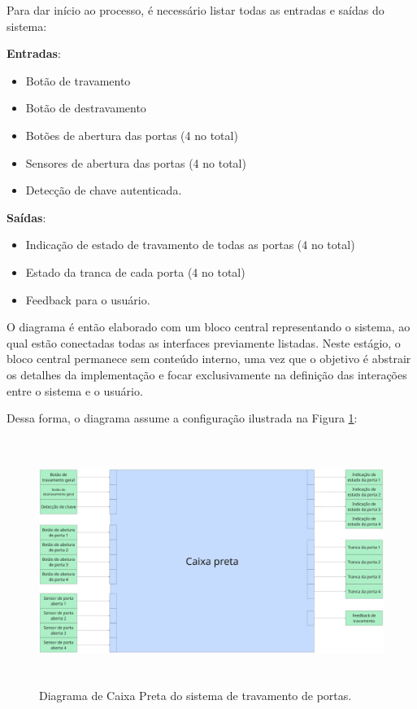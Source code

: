 Para dar início ao processo, é necessário listar todas as entradas e saídas do sistema:

\textbf{Entradas}:

\begin{itemize}
    \item Botão de travamento
    \item Botão de destravamento
    \item Botões de abertura das portas (4 no total)
    \item Sensores de abertura das portas (4 no total)
    \item Detecção de chave autenticada.
\end{itemize}

\textbf{Saídas}:

\begin{itemize}
    \item Indicação de estado de travamento de todas as portas (4 no total)
    \item Estado da tranca de cada porta (4 no total)
    \item Feedback para o usuário.
\end{itemize}

O diagrama é então elaborado com um bloco central representando o sistema, ao qual estão conectadas todas as interfaces previamente listadas. Neste estágio, 
o bloco central permanece sem conteúdo interno, uma vez que o objetivo é abstrair os detalhes da implementação e focar exclusivamente na definição das 
interações entre o sistema e o usuário.

Dessa forma, o diagrama assume a configuração ilustrada na Figura \ref{fig:caixapreta}:

\begin{figure}[H]
\centering
\includegraphics[height=8cm]{figuras/diagrama_caixa_preta.png}
\caption{Diagrama de Caixa Preta do sistema de travamento de portas.}
\label{fig:caixapreta}
\end{figure}

